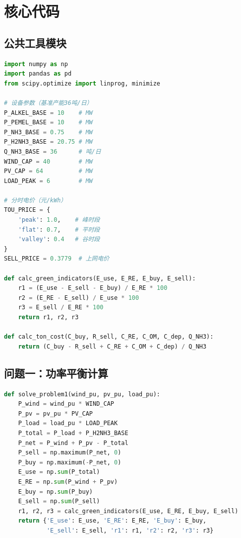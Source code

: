 \section{核心代码}

\subsection{公共工具模块}

\begin{lstlisting}[language=Python, basicstyle=\ttfamily\footnotesize, breaklines=true]
import numpy as np
import pandas as pd
from scipy.optimize import linprog, minimize

# 设备参数（基准产能36吨/日）
P_ALKEL_BASE = 10    # MW
P_PEMEL_BASE = 10    # MW
P_NH3_BASE = 0.75    # MW
P_H2NH3_BASE = 20.75 # MW
Q_NH3_BASE = 36      # 吨/日
WIND_CAP = 40        # MW
PV_CAP = 64          # MW
LOAD_PEAK = 6        # MW

# 分时电价（元/kWh）
TOU_PRICE = {
    'peak': 1.0,    # 峰时段
    'flat': 0.7,    # 平时段
    'valley': 0.4   # 谷时段
}
SELL_PRICE = 0.3779  # 上网电价

def calc_green_indicators(E_use, E_RE, E_buy, E_sell):
    r1 = (E_use - E_sell - E_buy) / E_RE * 100
    r2 = (E_RE - E_sell) / E_use * 100
    r3 = E_sell / E_RE * 100
    return r1, r2, r3

def calc_ton_cost(C_buy, R_sell, C_RE, C_OM, C_dep, Q_NH3):
    return (C_buy - R_sell + C_RE + C_OM + C_dep) / Q_NH3
\end{lstlisting}

\subsection{问题一：功率平衡计算}

\begin{lstlisting}[language=Python, basicstyle=\ttfamily\footnotesize, breaklines=true]
def solve_problem1(wind_pu, pv_pu, load_pu):
    P_wind = wind_pu * WIND_CAP
    P_pv = pv_pu * PV_CAP
    P_load = load_pu * LOAD_PEAK
    P_total = P_load + P_H2NH3_BASE
    P_net = P_wind + P_pv - P_total
    P_sell = np.maximum(P_net, 0)
    P_buy = np.maximum(-P_net, 0)
    E_use = np.sum(P_total)
    E_RE = np.sum(P_wind + P_pv)
    E_buy = np.sum(P_buy)
    E_sell = np.sum(P_sell)
    r1, r2, r3 = calc_green_indicators(E_use, E_RE, E_buy, E_sell)
    return {'E_use': E_use, 'E_RE': E_RE, 'E_buy': E_buy,
            'E_sell': E_sell, 'r1': r1, 'r2': r2, 'r3': r3}
\end{lstlisting}

